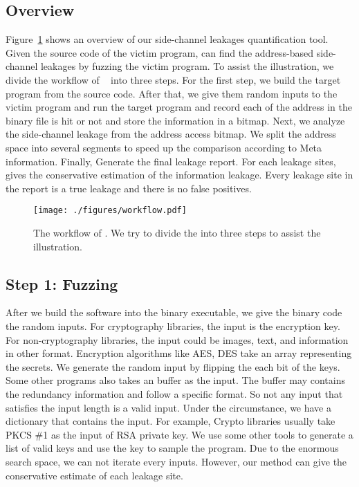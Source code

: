 \subsection{Overview}
Figure~\ref{fig:workflow} shows an overview of our side-channel leakages quantification tool. Given the source code of the victim program, \tool{} can find the address-based side-channel leakages by fuzzing the victim program. To assist the illustration, we divide the workflow of ~\tool{} into three steps. For the first step, we build the target program from the source code. After that, we give them random inputs to the victim program and run the target program and record each of the address in the binary file is hit or not and store the information in a bitmap. Next, we analyze the side-channel leakage from the address access bitmap. We split the address space into several segments to speed up the comparison according to Meta information. Finally, \tool{} Generate the final leakage report. For each leakage sites, \tool{} gives the conservative estimation of the information leakage. Every leakage site in the report is a true leakage and there is no false positives.

\begin{figure}[ht]
    \centering
    \texttt{[image: ./figures/workflow.pdf]}
    \caption{The workflow of \tool{}. We try to divide the \tool{} into three steps to assist the illustration. }\label{fig:workflow}
\end{figure}

\subsection{Step 1: Fuzzing}
After we build the software into the binary executable, we give the binary code the random inputs. For cryptography libraries, the input is the encryption key. For non-cryptography libraries, the input could be images, text, and information in other format. Encryption algorithms like AES, DES take an array representing the secrets. We generate the random input by flipping the each bit of the keys. Some other programs also takes an buffer as the input. The buffer may contains the redundancy information and follow a specific format. So not any input that satisfies the input length is a valid input. Under the circumstance, we have a dictionary that contains the input. For example, Crypto libraries usually take PKCS \#1 as the input of RSA private key. We use some other tools to generate a list of valid keys and use the key to sample the program. Due to the enormous search space, we can not iterate every inputs. However, our method can give the conservative  estimate of each leakage site. 
